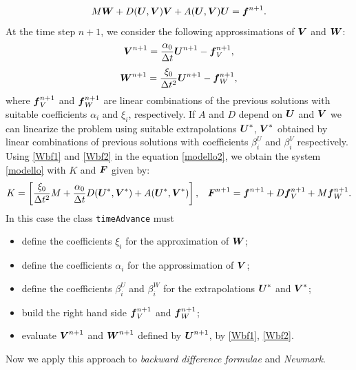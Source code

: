 \documentclass[english,a4paper]{article}
\newcommand{\Ubf}{\text{\mbox{\boldmath $U$}}}
\newcommand{\Abf}{\text{\mbox{\boldmath $W$}}}
\newcommand{\fbf}{\text{\mbox{\boldmath $f$}}}
\newcommand{\Fbf}{\text{\mbox{\boldmath $F$}}}
\newcommand{\Wbf}{\text{\mbox{\boldmath $V$}}}
\begin{document}
\begin{equation}\label{modello2}
M\Abf+D(\Ubf, \Wbf)\Wbf+ A(\Ubf,\Wbf)\Ubf=\fbf^{n+1}.
\end{equation}
At the time step $n+1$, we consider the following approssimations of
$\Wbf$ and $\Abf$:
\begin{equation}\label{Wbf1}
\Wbf^{n+1}=\frac{\alpha_0}{\Delta t}\Ubf^{n+1}-\fbf_V^{n+1},
\end{equation}
\begin{equation}\label{Wbf2}
\Abf^{n+1}=\frac{\xi_0}{\Delta t^2}\Ubf^{n+1}-\fbf_W^{n+1}, 
\end{equation}
where $\fbf_V^{n+1}$ and $\fbf_W^{n+1}$ are  linear combinations of the previous  solutions with
suitable coefficients $\alpha_i$ and $\xi_i$, respectively.
If  $A$ and $D$ depend on  $\Ubf$ and $\Wbf$ we can linearize the
problem using suitable extrapolations $\Ubf^*$, $\Wbf^*$ obtained
by linear combinations of previous solutions with coefficients
$\beta_i^U$ and $\beta_i^V$ respectively.\\
Using \eqref{Wbf1} and \eqref{Wbf2} in the equation \eqref{modello2},
we obtain the system   \eqref{modello} with $K$ and $\Fbf$ given by:
\begin{eqnarray*}
 &K=\left[\frac{\xi_0}{\Delta t^2} M +\frac{\alpha_0}{\Delta
     t}D(\Ubf^*, \Wbf^*)+A(\Ubf^*, \Wbf^*)\right],&
\Fbf^{n+1}=\fbf^{n+1}+D\fbf_V^{n+1}+M\fbf_W^{n+1}.
\end{eqnarray*}
In this case the class \verb"timeAdvance" must 
\begin{itemize}
\item define the coefficients $\xi_i$ for the approximation of $\Abf$;
\item define the coefficients $\alpha_i$ for the approssimation of $\Wbf$;
\item define the coefficients $\beta_i^U$ and $\beta_i^W$ for  the extrapolations  $\Ubf^{*}$ and $\Wbf^{*}$;  
\item build the right hand side  $\fbf_V^{n+1}$ and $\fbf_W^{n+1}$; 
\item evaluate  $\Wbf^{n+1}$ and $\Abf^{n+1}$ defined by $\Ubf^{n+1}$,
  by \eqref{Wbf1}, \eqref{Wbf2}.
\end{itemize}
Now we apply this approach to {\sl backward difference formulae } and
{\sl Newmark}.
\end{document}

